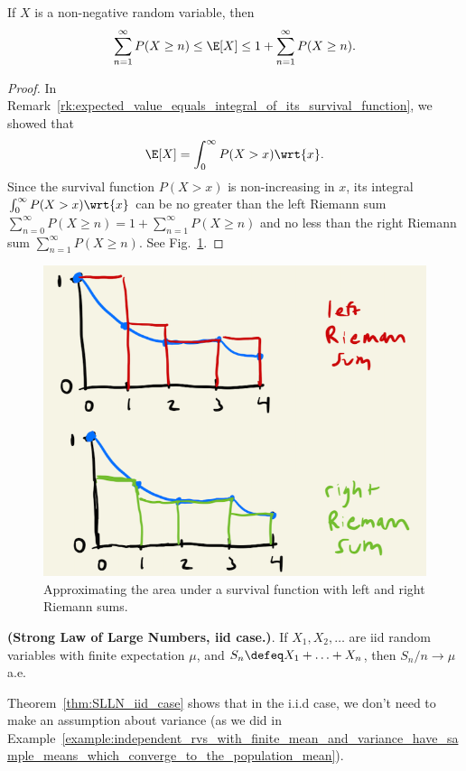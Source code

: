 \documentclass{article} %
\begin{document}
\begin{lemma}
If $X$ is a non-negative random variable, then
%
\[ \sum_{n=1}^\infty P(X \geq n) \leq \E[X] \leq 1 + \sum_{n=1}^\infty P(X \geq n).\] 
%
\label{lemma:expectation_of_nonnegative_random_variable_can_be_bounded_by_Riemann_sum_appoximations_to_survival_function}	
\end{lemma}

\begin{proof}
In Remark~\ref{rk:expected_value_equals_integral_of_its_survival_function}, we showed that 
%
\[ \E[X] = \int_0^\infty P(X > x) \wrt{x}. \]
%
Since the survival function $P(X > x)$ is non-increasing in $x$, its integral $\int_0^\infty P(X > x) \wrt{x}$ can be no greater than the left Riemann sum $\sum_{n=0}^\infty P(X \geq n) = 1 + \sum_{n=1}^\infty P(X \geq n)$ and no less than the right Riemann sum $\sum_{n=1}^\infty P(X \geq n)$. See Fig.~\ref{fig:approximating_area_under_survival_function}.
\end{proof}

\begin{figure}[H]
\centering
\includegraphics[width=.4\linewidth]{images/approximating_area_under_survival_function}
\caption{Approximating the area under a survival function with left and right Riemann sums.}
\label{fig:approximating_area_under_survival_function}
\end{figure}

\begin{theorem}
\textbf{(Strong Law of Large Numbers, iid case.)}. If $X_1, X_2, \hdots$ are iid random variables with finite expectation $\mu$, and $S_n \defeq X_1 + \hdots + X_n$, then $S_n/n \to \mu$ a.e.
\label{thm:SLLN_iid_case}
\end{theorem}

\begin{remark}
Theorem~\ref{thm:SLLN_iid_case} shows that in the i.i.d case, we don't need to make an assumption about variance (as we did in Example~\ref{example:independent_rvs_with_finite_mean_and_variance_have_sample_means_which_converge_to_the_population_mean}).	
\end{remark}
\end{document}
